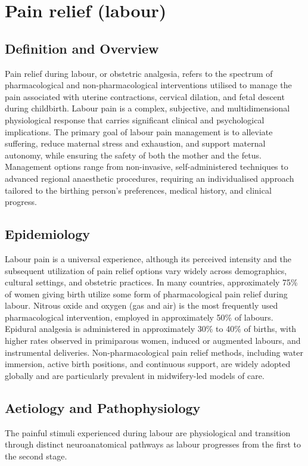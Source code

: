 \chapter{Pain relief (labour)}

\section*{Definition and Overview}
Pain relief during labour, or obstetric analgesia, refers to the spectrum of pharmacological and non-pharmacological interventions utilised to manage the pain associated with uterine contractions, cervical dilation, and fetal descent during childbirth. Labour pain is a complex, subjective, and multidimensional physiological response that carries significant clinical and psychological implications. The primary goal of labour pain management is to alleviate suffering, reduce maternal stress and exhaustion, and support maternal autonomy, while ensuring the safety of both the mother and the fetus. Management options range from non-invasive, self-administered techniques to advanced regional anaesthetic procedures, requiring an individualised approach tailored to the birthing person's preferences, medical history, and clinical progress.

\section*{Epidemiology}
Labour pain is a universal experience, although its perceived intensity and the subsequent utilization of pain relief options vary widely across demographics, cultural settings, and obstetric practices. In many countries, approximately 75\% of women giving birth utilize some form of pharmacological pain relief during labour. Nitrous oxide and oxygen (gas and air) is the most frequently used pharmacological intervention, employed in approximately 50\% of labours. Epidural analgesia is administered in approximately 30\% to 40\% of births, with higher rates observed in primiparous women, induced or augmented labours, and instrumental deliveries. Non-pharmacological pain relief methods, including water immersion, active birth positions, and continuous support, are widely adopted globally and are particularly prevalent in midwifery-led models of care.

\section*{Aetiology and Pathophysiology}
The painful stimuli experienced during labour are physiological and transition through distinct neuroanatomical pathways as labour progresses from the first to the second stage.

